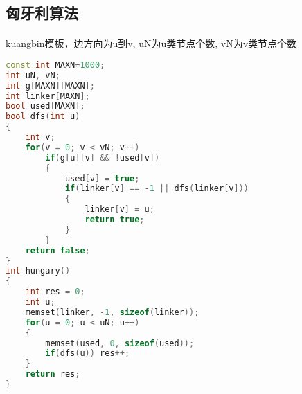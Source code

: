 ﻿\subsection{匈牙利算法}
	\paragraph{}
	kuangbin模板，边方向为u到v, uN为u类节点个数, vN为v类节点个数
	\begin{lstlisting}[language=C++]
const int MAXN=1000;
int uN, vN;
int g[MAXN][MAXN]; 
int linker[MAXN];
bool used[MAXN];
bool dfs(int u)
{
    int v;
    for(v = 0; v < vN; v++)
        if(g[u][v] && !used[v])
        {
            used[v] = true;
            if(linker[v] == -1 || dfs(linker[v]))
            {
                linker[v] = u;
                return true;
            }    
        }  
    return false;  
}    
int hungary()
{
    int res = 0;
    int u;
    memset(linker, -1, sizeof(linker));
    for(u = 0; u < uN; u++)
    {
        memset(used, 0, sizeof(used));
        if(dfs(u)) res++;
    }
    return res;   
}	
	\end{lstlisting}
	